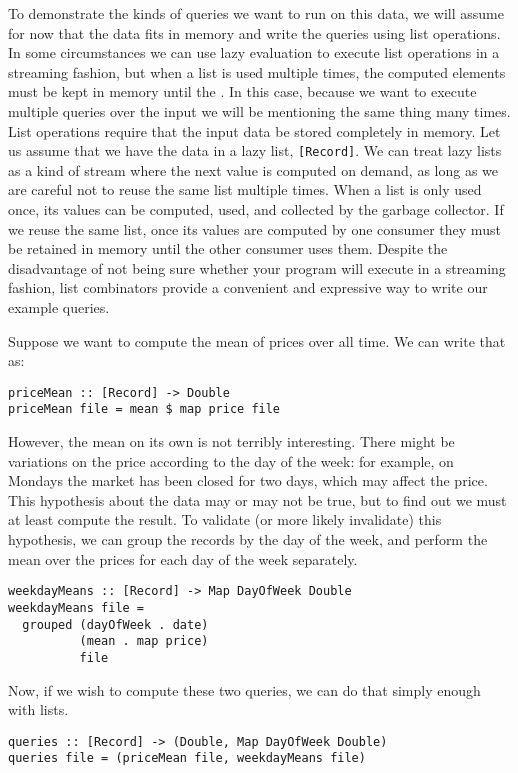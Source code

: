 To demonstrate the kinds of queries we want to run on this data, we will assume for now that the data fits in memory and write the queries using list operations.
In some circumstances we can use lazy evaluation to execute list operations in a streaming fashion, but when a list is used multiple times, the computed elements must be kept in memory until the .
In this case, because we want to execute multiple queries over the input we will be mentioning the same thing many times.
List operations require that the input data be stored completely in memory.
Let us assume that we have the data in a lazy list, \lstinline/[Record]/.
We can treat lazy lists as a kind of stream where the next value is computed on demand, as long as we are careful not to reuse the same list multiple times.
When a list is only used once, its values can be computed, used, and collected by the garbage collector.
If we reuse the same list, once its values are computed by one consumer they must be retained in memory until the other consumer uses them.
Despite the disadvantage of not being sure whether your program will execute in a streaming fashion, list combinators provide a convenient and expressive way to write our example queries.

Suppose we want to compute the mean of prices over all time.
We can write that as:

\begin{lstlisting}
priceMean :: [Record] -> Double
priceMean file = mean $ map price file
\end{lstlisting}

However, the mean on its own is not terribly interesting.
There might be variations on the price according to the day of the week: for example, on Mondays the market has been closed for two days, which may affect the price.
This hypothesis about the data may or may not be true, but to find out we must at least compute the result.
To validate (or more likely invalidate) this hypothesis, we can group the records by the day of the week, and perform the mean over the prices for each day of the week separately.

\begin{lstlisting}
weekdayMeans :: [Record] -> Map DayOfWeek Double
weekdayMeans file = 
  grouped (dayOfWeek . date)
          (mean . map price)
          file
\end{lstlisting}

Now, if we wish to compute these two queries, we can do that simply enough with lists.
\begin{lstlisting}
queries :: [Record] -> (Double, Map DayOfWeek Double)
queries file = (priceMean file, weekdayMeans file)
\end{lstlisting}

